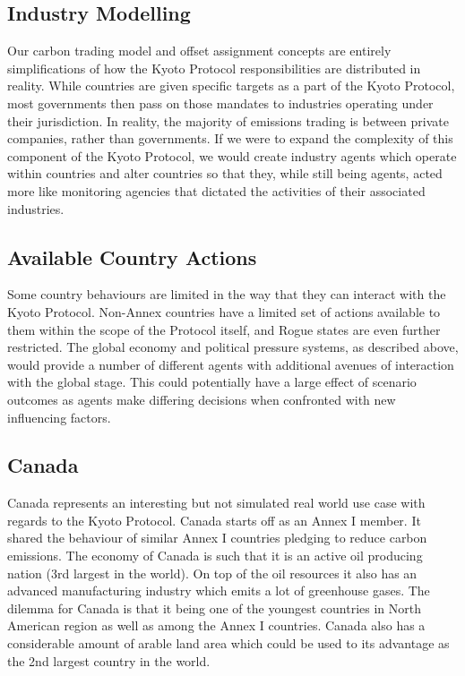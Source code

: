 \subsection{Industry Modelling}

Our carbon trading model and offset assignment concepts are entirely simplifications of how the Kyoto Protocol responsibilities are distributed in reality. While countries are given specific targets as a part of the Kyoto Protocol, most governments then pass on those mandates to industries operating under their jurisdiction. In reality, the majority of emissions trading is between private companies, rather than governments. If we were to expand the complexity of this component of the Kyoto Protocol, we would create industry agents which operate within countries and alter countries so that they, while still being agents, acted more like monitoring agencies that dictated the activities of their associated industries.

\subsection{Available Country Actions}

Some country behaviours are limited in the way that they can interact with the Kyoto Protocol. Non-Annex countries have a limited set of actions available to them within the scope of the Protocol itself, and Rogue states are even further restricted. The global economy and political pressure systems, as described above, would provide a number of different agents with additional avenues of interaction with the global stage. This could potentially have a large effect of scenario outcomes as agents make differing decisions when confronted with new influencing factors.

\subsection{Canada}

%
%

Canada represents an interesting but not simulated real world use case with regards to the Kyoto Protocol. Canada starts off as an Annex I member. It shared the behaviour of similar Annex I countries pledging to reduce carbon emissions. The economy of Canada is such that it is an active oil producing nation (3rd largest in the world). On top of the oil resources it also has an advanced manufacturing industry which emits a lot of greenhouse gases. The dilemma for Canada is that it being one of the youngest countries in North American region as well as among the Annex I countries. Canada also has a considerable amount of arable land area which could be used to its advantage as the 2nd largest country in the world.

